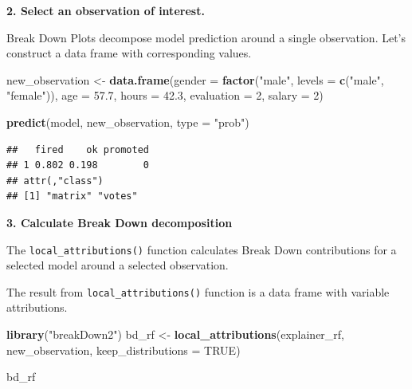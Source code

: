 \documentclass[]{krantz}
\newenvironment{Shaded}{\begin{snugshade}}{\end{snugshade}}
\newcommand{\DataTypeTok}[1]{\textcolor[rgb]{0.13,0.29,0.53}{#1}}
\newcommand{\DecValTok}[1]{\textcolor[rgb]{0.00,0.00,0.81}{#1}}
\newcommand{\FloatTok}[1]{\textcolor[rgb]{0.00,0.00,0.81}{#1}}
\newcommand{\KeywordTok}[1]{\textcolor[rgb]{0.13,0.29,0.53}{\textbf{#1}}}
\newcommand{\NormalTok}[1]{#1}
\newcommand{\OperatorTok}[1]{\textcolor[rgb]{0.81,0.36,0.00}{\textbf{#1}}}
\newcommand{\OtherTok}[1]{\textcolor[rgb]{0.56,0.35,0.01}{#1}}
\newcommand{\StringTok}[1]{\textcolor[rgb]{0.31,0.60,0.02}{#1}}
\theoremstyle{definition}
\theoremstyle{definition}
\theoremstyle{definition}
\theoremstyle{remark}
\begin{document}
\begin{Shaded}
\end{Shaded}

\textbf{2. Select an observation of interest.}

Break Down Plots decompose model prediction around a single observation.
Let's construct a data frame with corresponding values.

\begin{Shaded}
\begin{Highlighting}[]
\NormalTok{new_observation <-}\StringTok{ }\KeywordTok{data.frame}\NormalTok{(}\DataTypeTok{gender =} \KeywordTok{factor}\NormalTok{(}\StringTok{"male"}\NormalTok{, }\DataTypeTok{levels =} \KeywordTok{c}\NormalTok{(}\StringTok{"male"}\NormalTok{, }\StringTok{"female"}\NormalTok{)),}
                      \DataTypeTok{age =} \FloatTok{57.7}\NormalTok{,}
                      \DataTypeTok{hours =} \FloatTok{42.3}\NormalTok{,}
                      \DataTypeTok{evaluation =} \DecValTok{2}\NormalTok{,}
                      \DataTypeTok{salary =} \DecValTok{2}\NormalTok{)}

\KeywordTok{predict}\NormalTok{(model, new_observation, }\DataTypeTok{type =} \StringTok{"prob"}\NormalTok{)}
\end{Highlighting}
\end{Shaded}

\begin{verbatim}
##   fired    ok promoted
## 1 0.802 0.198        0
## attr(,"class")
## [1] "matrix" "votes"
\end{verbatim}

\textbf{3. Calculate Break Down decomposition}

The \texttt{local\_attributions()} function calculates Break Down
contributions for a selected model around a selected observation.

The result from \texttt{local\_attributions()} function is a data frame
with variable attributions.

\begin{Shaded}
\begin{Highlighting}[]
\KeywordTok{library}\NormalTok{(}\StringTok{"breakDown2"}\NormalTok{)}
\NormalTok{bd_rf <-}\StringTok{ }\KeywordTok{local_attributions}\NormalTok{(explainer_rf,}
\NormalTok{                 new_observation,}
                 \DataTypeTok{keep_distributions =} \OtherTok{TRUE}\NormalTok{)}

\NormalTok{bd_rf}
\end{Highlighting}
\end{Shaded}
\end{document}
